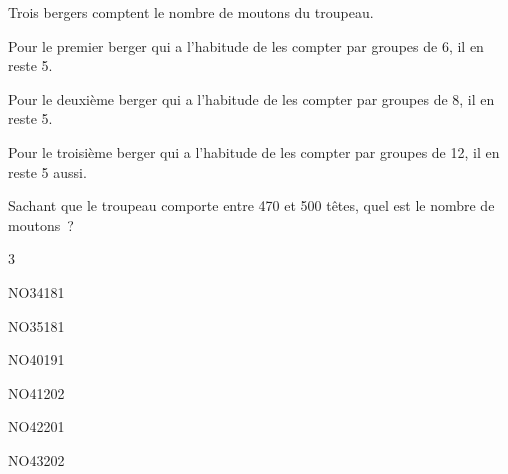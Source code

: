 \documentclass[a4paper,12pt]{report}
\begin{document}
\begin{exo}{
    Trois bergers comptent le nombre de moutons du troupeau.

    Pour le premier berger qui a l'habitude de les compter par groupes de 6, il en reste 5. 

    Pour le deuxième berger qui a l'habitude de les compter par groupes de 8, il en reste 5.

    Pour le troisième berger qui a l'habitude de les compter par groupes de 12, il en reste 5 aussi. 

Sachant que le troupeau comporte entre 470 et 500 têtes, quel est le nombre de moutons~?

}{3}\end{exo}



\begin{exol}{NO34}{18}{1}
\end{exol}

\begin{exol}{NO35}{18}{1}
\end{exol}

\begin{exol}{NO40}{19}{1}
\end{exol}

\begin{exol}{NO41}{20}{2}
\end{exol}

\begin{exol}{NO42}{20}{1}
\end{exol}

\begin{exol}{NO43}{20}{2}
\end{exol}
\end{document}
